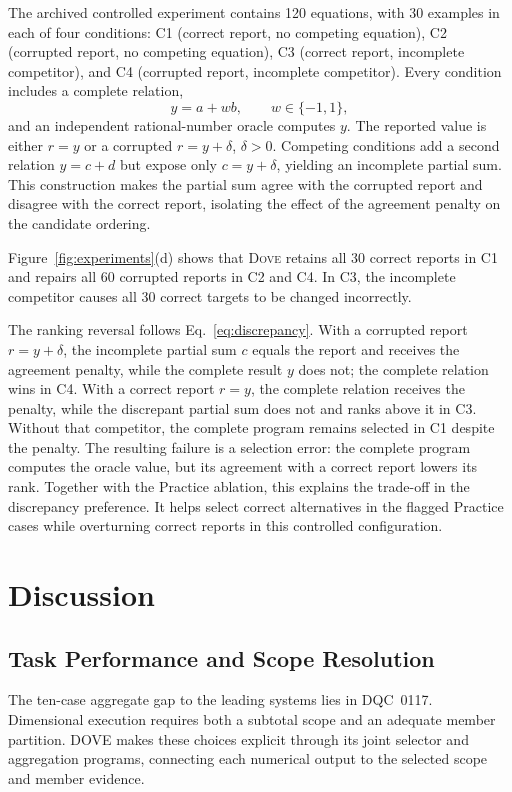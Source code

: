 \documentclass[conference]{IEEEtran}
\newcommand{\dove}{\textsc{Dove}}
\begin{document}
The archived controlled experiment contains 120 equations, with 30 examples in each of four conditions: C1 (correct report, no competing equation), C2 (corrupted report, no competing equation), C3 (correct report, incomplete competitor), and C4 (corrupted report, incomplete competitor). Every condition includes a complete relation,
\begin{equation}
y=a+wb,\qquad w\in\{-1,1\},
\end{equation}
and an independent rational-number oracle computes $y$. The reported value is either $r=y$ or a corrupted $r=y+\delta$, $\delta>0$. Competing conditions add a second relation $y=c+d$ but expose only $c=y+\delta$, yielding an incomplete partial sum. This construction makes the partial sum agree with the corrupted report and disagree with the correct report, isolating the effect of the agreement penalty on the candidate ordering.

Figure~\ref{fig:experiments}(d) shows that \dove{} retains all 30 correct reports in C1 and repairs all 60 corrupted reports in C2 and C4. In C3, the incomplete competitor causes all 30 correct targets to be changed incorrectly.

The ranking reversal follows Eq.~\eqref{eq:discrepancy}. With a corrupted report $r=y+\delta$, the incomplete partial sum $c$ equals the report and receives the agreement penalty, while the complete result $y$ does not; the complete relation wins in C4. With a correct report $r=y$, the complete relation receives the penalty, while the discrepant partial sum does not and ranks above it in C3. Without that competitor, the complete program remains selected in C1 despite the penalty. The resulting failure is a selection error: the complete program computes the oracle value, but its agreement with a correct report lowers its rank. Together with the Practice ablation, this explains the trade-off in the discrepancy preference. It helps select correct alternatives in the flagged Practice cases while overturning correct reports in this controlled configuration.

\section{Discussion}

\subsection{Task Performance and Scope Resolution}
The ten-case aggregate gap to the leading systems lies in DQC~0117. Dimensional execution requires both a subtotal scope and an adequate member partition. DOVE makes these choices explicit through its joint selector and aggregation programs, connecting each numerical output to the selected scope and member evidence.
\end{document}

